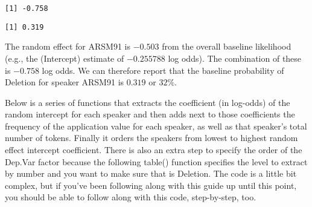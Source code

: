 \documentclass[
  10pt,
  letterpaper]{article}
\newenvironment{Shaded}{\begin{snugshade}}{\end{snugshade}}
\newcommand{\CommentTok}[1]{\textcolor[rgb]{0.37,0.37,0.37}{#1}}
\newcommand{\FunctionTok}[1]{\textcolor[rgb]{0.28,0.35,0.67}{#1}}
\newcommand{\NormalTok}[1]{\textcolor[rgb]{0.00,0.23,0.31}{#1}}
\newcommand{\SpecialCharTok}[1]{\textcolor[rgb]{0.37,0.37,0.37}{#1}}
\newcommand{\StringTok}[1]{\textcolor[rgb]{0.13,0.47,0.30}{#1}}
\renewcommand\texttt[1]{{\ttfamily\color{BrickRed}#1}}
\begin{document}
\begin{verbatim}
[1] -0.758
\end{verbatim}

\begin{Shaded}
\end{Shaded}

\begin{verbatim}
[1] 0.319
\end{verbatim}

The random effect for \texttt{ARSM91} is \(-0.503\) from the overall
baseline likelihood (e.g., the \texttt{(Intercept)} estimate of
\(-0.255788\) log odds). The combination of these is \(-0.758\) log
odds. We can therefore report that the baseline probability of
\texttt{Deletion} for speaker \texttt{ARSM91} is \(0.319\) or \(32\%\).

Below is a series of functions that extracts the coefficient (in
log-odds) of the random intercept for each speaker and then adds next to
those coefficients the frequency of the application value for each
speaker, as well as that speaker's total number of tokens. Finally it
orders the speakers from lowest to highest random effect intercept
coefficient. There is also an extra step to specify the order of the
\texttt{Dep.Var} factor because the following \texttt{table()} function
specifies the level to extract by number and you want to make sure that
is \texttt{Deletion}. The code is a little bit complex, but if you've
been following along with this guide up until this point, you should be
able to follow along with this code, step-by-step, too.
\end{document}
